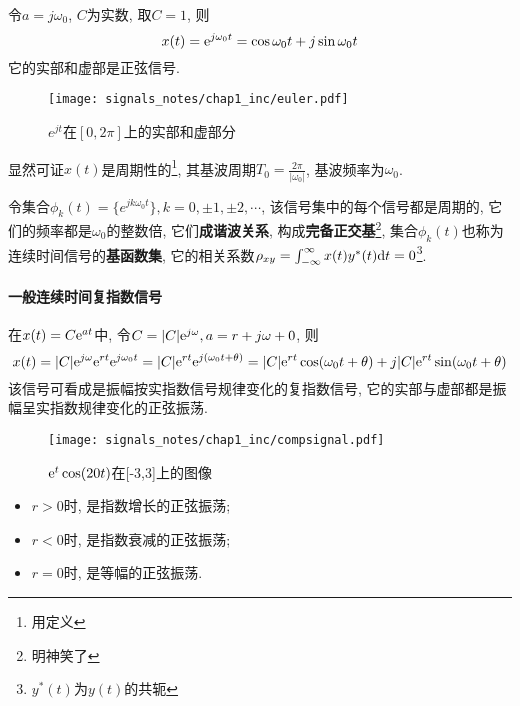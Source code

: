                 令$a=j\omega_0$, $C$为实数, 取$C=1$, 则
                \[x(t)=\mathrm{e}^{j\omega_0t}=\cos\omega_0t+j\sin\omega_0t\]
                它的实部和虚部是正弦信号.

                \begin{figure}[h]\centering
                    \texttt{[image: signals\_notes/chap1\_inc/euler.pdf]}
                    \caption{$e^{jt}$在$[0, 2\pi]$上的实部和虚部分}
                    \label{fig:2:euler}
                \end{figure}

                显然可证$x(t)$是周期性的\footnote{用定义}, 其基波周期$T_0=\frac{2\pi}{|\omega_0|}$, 基波频率为$\omega_0$.

                令集合$\phi_k(t)=\{e^{jk\omega_0t}\}, k=0, \pm1, \pm2, \cdots$, 该信号集中的每个信号都是周期的, 它们的频率都是$\omega_0$的整数倍, 它们\textbf{成谐波关系}, 构成\textbf{完备正交基}\footnote{明神笑了}, 集合$\phi_k(t)$也称为连续时间信号的\textbf{基函数集}, 它的相关系数$\rho_{xy}=\int_{-\infty}^{\infty}x(t)y^*(t)\mathrm{d} t=0$\footnote{$y^*(t)$为$y(t)$的共轭}.

            \paragraph{一般连续时间复指数信号}

                在$x(t)=C\mathrm{e}^{at}$中, 令$C=|C|\mathrm{e}^{j\omega}, a=r+j\omega+0$, 则
                \[x(t)=|C|\mathrm{e}^{j\omega}\mathrm{e}^{rt}\mathrm{e}^{j\omega_0t}=|C|\mathrm{e}^{rt}\mathrm{e}^{j(\omega_0t+\theta)}=|C|\mathrm{e}^{rt}\cos(\omega_0t+\theta)+j|C|\mathrm{e}^{rt}\sin(\omega_0t+\theta)\]
                该信号可看成是振幅按实指数信号规律变化的复指数信号, 它的实部与虚部都是振幅呈实指数规律变化的正弦振荡.

                \begin{figure}[h]\centering
                    \texttt{[image: signals\_notes/chap1\_inc/compsignal.pdf]}
                    \caption{$\mathrm{e}^t\cos(20t)$在[-3,3]上的图像}
                    \label{fig:2:comp-signal}
                \end{figure}

                \begin{itemize}
                    \item $r>0$时, 是指数增长的正弦振荡;
                    \item $r<0$时, 是指数衰减的正弦振荡;
                    \item $r=0$时, 是等幅的正弦振荡.
                \end{itemize}
            
